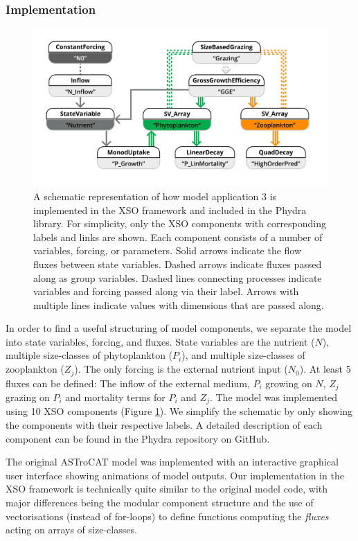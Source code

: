 \documentclass[journal abbreviation, manuscript]{copernicus}
\begin{document}
\subsubsection{Implementation}
\begin{figure}[t]
\includegraphics[width=15cm]{Figures/firstdraft_schematics/code_schematics/ASTroCAT.pdf}
\caption{ A schematic representation of how model application 3 is implemented in the XSO framework and included in the Phydra library. For simplicity, only the XSO components with corresponding labels and links are shown. Each component consists of a number of variables, forcing, or parameters. Solid arrows indicate the flow fluxes between state variables. Dashed arrows indicate fluxes passed along as group variables. Dashed lines connecting processes indicate variables and forcing passed along via their label. Arrows with multiple lines indicate values with dimensions that are passed along.}
\label{Figure:CodeSchematics_3}
\end{figure}

In order to find a useful structuring of model components, we separate the model into state variables, forcing, and fluxes. State variables are the nutrient ($N$), multiple size-classes of phytoplankton ($P_i$), and multiple size-classes of zooplankton ($Z_j$). The only forcing is the external nutrient input ($N_0$). At least 5 fluxes can be defined: The inflow of the external medium, $P_i$ growing on $N$, $Z_j$ grazing on $P_i$ and mortality terms for $P_i$ and $Z_j$.
The model was implemented using 10 XSO components (Figure \ref{Figure:CodeSchematics_3}). We simplify the schematic by only showing the components with their respective labels. A detailed description of each component can be found in the Phydra repository on GitHub.

The original ASTroCAT model was implemented with an interactive graphical user interface showing animations of model outputs. Our implementation in the XSO framework is technically quite similar to the original model code, with major differences being the modular component structure and the use of vectorisations (instead of for-loops) to define functions computing the \textit{fluxes} acting on arrays of size-classes.
\end{document}
